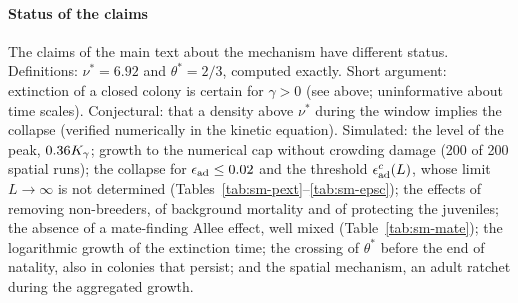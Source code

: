 \paragraph{Status of the claims}
The claims of the main text about the mechanism have different status. Definitions: $\nu^*=6.92$ and $\theta^*=2/3$,
computed exactly. Short argument: extinction of a closed colony is certain for $\gamma>0$ (see above; uninformative
about time scales). Conjectural: that a density above $\nu^*$ during the window implies the collapse (verified
numerically in the kinetic equation). Simulated: the level of the peak, $0.36K_\gamma$; growth to the numerical cap without
crowding damage (200 of 200 spatial runs); the collapse for $\epsilon_{\rm ad}\le0.02$ and the threshold $\epsilon_{\rm ad}^c(L)$, whose
limit $L\to\infty$ is not determined (Tables~\ref{tab:sm-pext}--\ref{tab:sm-epsc}); the effects of removing
non-breeders, of background mortality and of protecting the juveniles; the absence of a mate-finding Allee effect,
well mixed (Table~\ref{tab:sm-mate}); the logarithmic growth of the extinction time; the crossing of $\theta^*$
before the end of natality, also in colonies that persist; and the spatial mechanism, an adult ratchet during the
aggregated growth.
